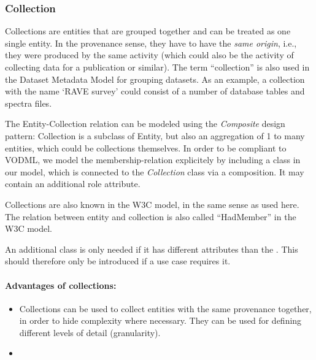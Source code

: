 \subsubsection{Collection}\label{sec:collection}
Collections are entities that are grouped together and can be treated as one single entity. 
In the provenance sense, they have to have the \emph{same origin}, i.e., they were 
produced by the same activity (which could also be the activity of collecting
data for a publication or similar). The term ``collection'' is 
also used in the Dataset Metadata Model for grouping datasets.
As an example, a collection 
with the name `RAVE survey' could consist of a number of database tables and spectra files.


The Entity-Collection relation can be modeled using the \emph{Composite} design pattern: 
Collection is a subclass of Entity, but also an aggregation of 1 to many entities, 
which could be collections themselves. 
In order to be compliant to VODML, we model the membership-relation explicitely 
by including a  class in our model, which is connected to the
\emph{Collection} class via a composition. It may contain an additional role attribute.

Collections are also known in the W3C model, in the same sense as used here.
The relation between entity and collection is also called ``HadMember'' in the W3C model.

An additional class  is only 
needed if it has different attributes than 
the . This should therefore only be introduced if a use case requires it.

\paragraph{Advantages of collections:}
\begin{itemize}
\item Collections can be used to collect entities with the same provenance together, 
    in order to hide complexity where necessary. They can be used for defining 
    different levels of detail (granularity).
\item {}
\end{itemize}





